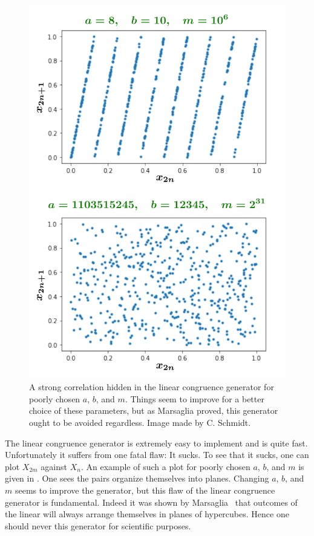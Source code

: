 \begin{figure}
\centering
\includegraphics[width=0.9\linewidth]{figs/linear_congruence.pdf}
\caption{A strong correlation hidden in the linear congruence generator for
poorly chosen $a$, $b$, and $m$. Things seem to improve for a better choice of
these parameters, but as Marsaglia proved, this generator ought to be avoided
regardless. Image made by C. Schmidt.}
\label{fig:LCG}
\end{figure}

The linear congruence generator is extremely easy to implement and is quite
fast. Unfortunately it suffers from one fatal flaw: It sucks. To see that it
sucks, one can plot $X_{2m}$ against $X_n$. An example of such a plot for
poorly chosen $a$, $b$, and $m$ is given in . One sees the
pairs organize themselves into planes. Changing $a$, $b$, and $m$ seems
to improve the generator, but this flaw of the linear congruence generator
is fundamental. Indeed it was shown by Marsaglia~\cite{marsaglia_random_1968} that
outcomes of the linear will always arrange themselves in planes of hypercubes.
Hence one should never this generator for scientific purposes.

